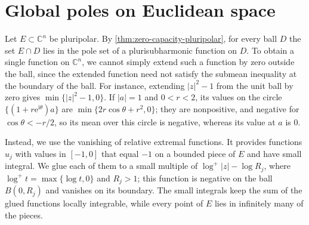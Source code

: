 \section{Global poles on Euclidean space}
\label{sec:josefson}

Let $E\subset\mathbb C^n$ be pluripolar. By \cref{thm:zero-capacity-pluripolar}, for every ball $D$ the set $E\cap D$ lies in the pole set of a plurisubharmonic function on $D$. To obtain a single function on $\mathbb C^n$, we cannot simply extend such a function by zero outside the ball, since the extended function need not satisfy the submean inequality at the boundary of the ball. For instance, extending $|z|^2-1$ from the unit ball by zero gives $\min\{|z|^2-1,0\}$. If $|a|=1$ and $0<r<2$, its values on the circle $\{(1+r\mathrm e^{\mathrm i\theta})a\}$ are $\min\{2r\cos\theta+r^2,0\}$; they are nonpositive, and negative for $\cos\theta<-r/2$, so its mean over this circle is negative, whereas its value at $a$ is $0$.

Instead, we use the vanishing of relative extremal functions. It provides functions $u_j$ with values in $[-1,0]$ that equal $-1$ on a bounded piece of $E$ and have small integral. We glue each of them to a small multiple of $\log^+|z|-\log R_j$, where $\log^+t=\max\{\log t,0\}$ and $R_j>1$; this function is negative on the ball $B(0,R_j)$ and vanishes on its boundary. The small integrals keep the sum of the glued functions locally integrable, while every point of $E$ lies in infinitely many of the pieces.

